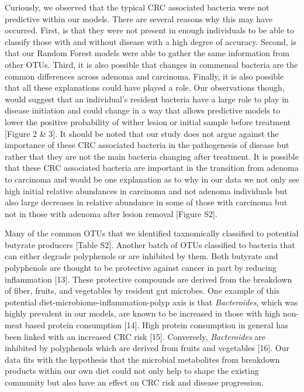 \documentclass[12pt,]{article}
\begin{document}
Curiously, we observed that the typical CRC associated bacteria were not
predictive within our models. There are several reasons why this may
have occurred. First, is that they were not present in enough
individuals to be able to classify those with and without disease with a
high degree of accuracy. Second, is that our Random Forest models were
able to gather the same information from other OTUs. Third, it is also
possible that changes in commensal bacteria are the common differences
across adenoma and carcinoma. Finally, it is also possible that all
these explanations could have played a role. Our observations though,
would suggest that an individual's resident bacteria have a large role
to play in disease initiation and could change in a way that allows
predictive models to lower the positive probability of wither lesion or
initial sample before treatment {[}Figure 2 \& 3{]}. It should be noted
that our study does not argue against the importance of these CRC
associated bacteria in the pathogenesis of disease but rather that they
are not the main bacteria changing after treatment. It is possible that
these CRC associated bacteria are important in the transition from
adenoma to carcinoma and would be one explanation as to why in our data
we not only see high initial relative abundances in carcinoma and not
adenoma individuals but also large decreases in relative abundance in
some of those with carcinoma but not in those with adenoma after lesion
removal {[}Figure S2{]}.

Many of the common OTUs that we identified taxnomically classified to
potential butyrate producers {[}Table S2{]}. Another batch of OTUs
classified to bacteria that can either degrade polyphenols or are
inhibited by them. Both butyrate and polyphenols are thought to be
protective against cancer in part by reducing inflammation {[}13{]}.
These protective compounds are derived from the breakdown of fiber,
fruits, and vegetables by resident gut microbes. One example of this
potential diet-microbiome-inflammation-polyp axis is that
\emph{Bacteroides}, which was highly prevalent in our models, are known
to be increased in those with high non-meat based protein consumption
{[}14{]}. High protein consumption in general has been linked with an
increased CRC risk {[}15{]}. Conversely, \emph{Bacteroides} are
inhibited by polyphenols which are derived from fruits and vegetables
{[}16{]}. Our data fits with the hypothesis that the microbial
metabolites from breakdown products within our own diet could not only
help to shape the existing community but also have an effect on CRC risk
and disease progression.
\end{document}
